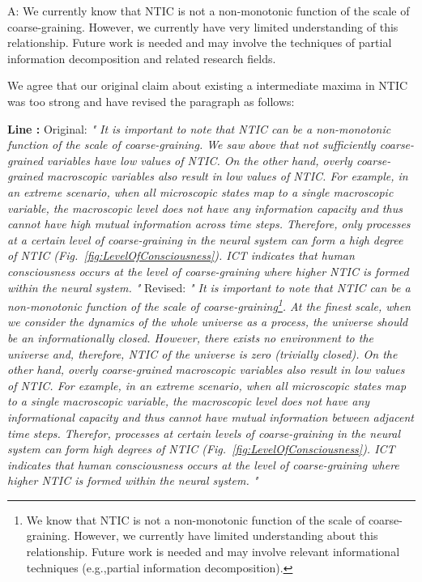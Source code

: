 \documentclass[utf8]{article}
\newenvironment{ans}  
    {\color{Black}\noindent A:}
    {~\newline}
\newcommand{\revise}[3]{
	\newline
	\newline
    \noindent
    \textbf{Line #1:}
    \newline
    Original:\newline
    \textit{"#2"}
    \newline
    \newline
    Revised:\newline
    \textit{"#3"}\newline}
\begin{document}
    	\begin{ans}
    	We currently know that NTIC is not a non-monotonic function of the scale of coarse-graining. However, we currently have very limited understanding of this relationship. Future work is needed and may involve the techniques of partial information decomposition and related research fields. 
    	
		We agree that our original claim about existing a intermediate maxima in NTIC was too strong and have revised the paragraph as follows: 
    
		\revise{}
		{
			It is important to note that NTIC can be a non-monotonic function of the scale of coarse-graining. We saw above that not sufficiently coarse-grained variables have low values of NTIC. On the other hand, overly coarse-grained macroscopic variables  also result in low values of NTIC. For example, in an extreme scenario, when all microscopic states map to a single macroscopic variable, the macroscopic level does not have any information capacity and thus cannot have high mutual information across time steps. Therefore, only processes at a certain level of coarse-graining in the neural system can form a high degree of NTIC (Fig.~\ref{fig:LevelOfConsciousness}). ICT indicates that human consciousness occurs at the level of coarse-graining where higher NTIC is formed within the neural system.
		}
		{
			It is important to note that NTIC can be a non-monotonic function of the scale of coarse-graining\footnote{We know that NTIC is not a non-monotonic function of the scale of coarse-graining. However, we currently have limited understanding about this relationship. Future work is needed and may involve relevant informational techniques (e.g.,partial information decomposition).}. At the finest scale, when we consider the dynamics of the whole universe as a process, the universe should be an informationally closed. However, there exists no environment to the universe and, therefore, NTIC of the universe is zero (trivially closed). On the other hand, overly coarse-grained macroscopic variables  also result in low values of NTIC. For example, in an extreme scenario, when all microscopic states map to a single macroscopic variable, the macroscopic level does not have any informational capacity and thus cannot have  mutual information between adjacent time steps.  Therefor, processes at certain levels of coarse-graining in the neural system can form high degrees of NTIC (Fig.~\ref{fig:LevelOfConsciousness}). ICT indicates that human consciousness occurs at the level of coarse-graining where higher NTIC is formed within the neural system.
		}
    	\end{ans}
    
\end{document}
